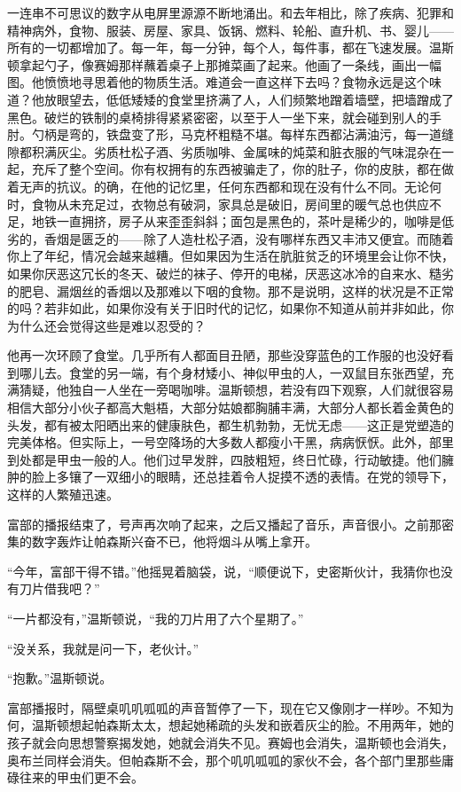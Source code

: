 一连串不可思议的数字从电屏里源源不断地涌出。和去年相比，除了疾病、犯罪和精神病外，食物、服装、房屋、家具、饭锅、燃料、轮船、直升机、书、婴儿------所有的一切都增加了。每一年，每一分钟，每个人，每件事，都在飞速发展。温斯顿拿起勺子，像赛姆那样蘸着桌子上那摊菜画了起来。他画了一条线，画出一幅图。他愤愤地寻思着他的物质生活。难道会一直这样下去吗？食物永远是这个味道？他放眼望去，低低矮矮的食堂里挤满了人，人们频繁地蹭着墙壁，把墙蹭成了黑色。破烂的铁制的桌椅排得紧紧密密，以至于人一坐下来，就会碰到别人的手肘。勺柄是弯的，铁盘变了形，马克杯粗糙不堪。每样东西都沾满油污，每一道缝隙都积满灰尘。劣质杜松子酒、劣质咖啡、金属味的炖菜和脏衣服的气味混杂在一起，充斥了整个空间。你有权拥有的东西被骗走了，你的肚子，你的皮肤，都在做着无声的抗议。的确，在他的记忆里，任何东西都和现在没有什么不同。无论何时，食物从未充足过，衣物总有破洞，家具总是破旧，房间里的暖气总也供应不足，地铁一直拥挤，房子从来歪歪斜斜；面包是黑色的，茶叶是稀少的，咖啡是低劣的，香烟是匮乏的------除了人造杜松子酒，没有哪样东西又丰沛又便宜。而随着你上了年纪，情况会越来越糟。但如果因为生活在肮脏贫乏的环境里会让你不快，如果你厌恶这冗长的冬天、破烂的袜子、停开的电梯，厌恶这冰冷的自来水、糙劣的肥皂、漏烟丝的香烟以及那难以下咽的食物。那不是说明，这样的状况是不正常的吗？若非如此，如果你没有关于旧时代的记忆，如果你不知道从前并非如此，你为什么还会觉得这些是难以忍受的？

他再一次环顾了食堂。几乎所有人都面目丑陋，那些没穿蓝色的工作服的也没好看到哪儿去。食堂的另一端，有个身材矮小、神似甲虫的人，一双鼠目东张西望，充满猜疑，他独自一人坐在一旁喝咖啡。温斯顿想，若没有四下观察，人们就很容易相信大部分小伙子都高大魁梧，大部分姑娘都胸脯丰满，大部分人都长着金黄色的头发，都有被太阳晒出来的健康肤色，都生机勃勃，无忧无虑------这正是党塑造的完美体格。但实际上，一号空降场的大多数人都瘦小干黑，病病恹恹。此外，部里到处都是甲虫一般的人。他们过早发胖，四肢粗短，终日忙碌，行动敏捷。他们臃肿的脸上多镶了一双细小的眼睛，还总挂着令人捉摸不透的表情。在党的领导下，这样的人繁殖迅速。

富部的播报结束了，号声再次响了起来，之后又播起了音乐，声音很小。之前那密集的数字轰炸让帕森斯兴奋不已，他将烟斗从嘴上拿开。

``今年，富部干得不错。''他摇晃着脑袋，说，``顺便说下，史密斯伙计，我猜你也没有刀片借我吧？''

``一片都没有，''温斯顿说，``我的刀片用了六个星期了。''

``没关系，我就是问一下，老伙计。''

``抱歉。''温斯顿说。

富部播报时，隔壁桌叽叽呱呱的声音暂停了一下，现在它又像刚才一样吵。不知为何，温斯顿想起帕森斯太太，想起她稀疏的头发和嵌着灰尘的脸。不用两年，她的孩子就会向思想警察揭发她，她就会消失不见。赛姆也会消失，温斯顿也会消失，奥布兰同样会消失。但帕森斯不会，那个叽叽呱呱的家伙不会，各个部门里那些庸碌往来的甲虫们更不会。

